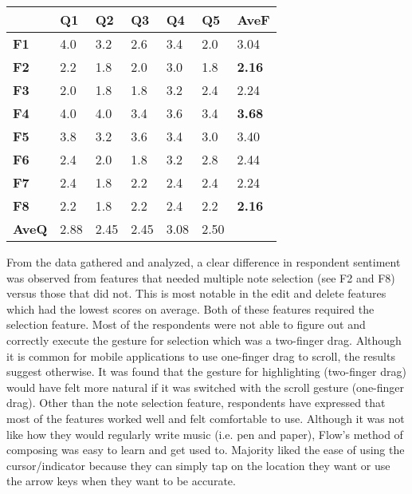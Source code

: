 			\begin{table}[!htpb]
			  \centering
			   \label{tab:results-features-it1}
			  \begin{tabular}{|R{1.5cm}|R{1cm}|R{1cm}|R{1cm}|R{1cm}|R{1cm}|R{1.5cm}|}
			  	\hline
			  	& \textbf{Q1} & \textbf{Q2} & \textbf{Q3} & \textbf{Q4} & \textbf{Q5} & \textbf{AveF} \\ 
			    \hline
			    \textbf{F1} & 4.0 		& 3.2 	& 2.6 	& 3.4 	& 2.0 	& 3.04 \\ \hline
			    \textbf{F2} & 2.2 		& 1.8 	& 2.0 	& 3.0 	& 1.8 	& \textbf{2.16} \\ \hline
			    \textbf{F3} & 2.0 		& 1.8 	& 1.8 	& 3.2 	& 2.4 	& 2.24 \\ \hline
			    \textbf{F4} & 4.0 		& 4.0 	& 3.4 	& 3.6 	& 3.4 	& \textbf{3.68} \\ \hline
			    \textbf{F5} & 3.8 		& 3.2 	& 3.6 	& 3.4 	& 3.0 	& 3.40 \\ \hline
			   	\textbf{F6} & 2.4 		& 2.0 	& 1.8 	& 3.2 	& 2.8 	& 2.44 \\ \hline
			    \textbf{F7} & 2.4 		& 1.8 	& 2.2 	& 2.4 	& 2.4 	& 2.24 \\ \hline
			    \textbf{F8} & 2.2 		& 1.8 	& 2.2 	& 2.4 	& 2.2 	& \textbf{2.16} \\
			    
			    \hline
			    \textbf{AveQ} & 2.88 & 2.45 & 2.45 & 3.08 & 2.50 & \\
			    \hline
			  \end{tabular}
			\end{table}

			From the data gathered and analyzed, a clear difference in respondent sentiment was observed from features that needed multiple note selection (see F2 and F8) versus those that did not. This is most notable in the edit and delete features which had the lowest scores on average. Both of these features required the selection feature. Most of the respondents were not able to figure out and correctly execute the gesture for selection which was a two-finger drag. Although it is common for mobile applications to use one-finger drag to scroll, the results suggest otherwise. It was found that the gesture for highlighting (two-finger drag) would have felt more natural if it was switched with the scroll gesture (one-finger drag). Other than the note selection feature, respondents have expressed that most of the features worked well and felt comfortable to use. Although it was not like how they would regularly write music (i.e. pen and paper), Flow's method of composing was easy to learn and get used to. Majority liked the ease of using the cursor/indicator because they can simply tap on the location they want or use the arrow keys when they want to be accurate.


